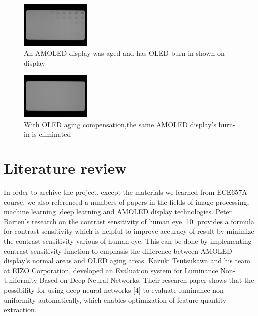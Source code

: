 \documentclass[runningheads]{llncs}
\begin{document}
\begin{figure}
    \centering
    \includegraphics[width=0.3\textwidth]{uncomp.jpeg}
    \caption{An AMOLED display was aged and has OLED burn-in shown on display}
    \label{fig:1}
\end{figure}
\begin{figure}
    \centering
    \includegraphics[width=0.3\textwidth]{comp.jpeg}
    \caption{With OLED aging compensation,the same AMOLED display's burn-in is eliminated}
    \label{fig:2}
\end{figure}

\section{Literature review}
In order to archive the project, except the materials we learned from ECE657A course, we also referenced a numbers of papers in the fields of image processing, machine learning ,deep learning and AMOLED display technologies. 
Peter Barten’s research on the contrast sensitivity of human eye [10] provides a formula for contrast sensitivity which is helpful to improve accuracy of result by minimize the contrast sensitivity various of human eye. This can be done by implementing contrast sensitivity function to emphasis the difference between AMOLED display's normal areas and OLED aging areas.
Kazuki Tsutsukawa and his team at EIZO Corporation, developed an Evaluation system for Luminance Non-Uniformity Based on Deep Neural Networks. Their research paper shows that the possibility for using deep neural networks [4] to evaluate luminance non-uniformity automatically, which enables optimization of feature quantity extraction.
\end{document}
